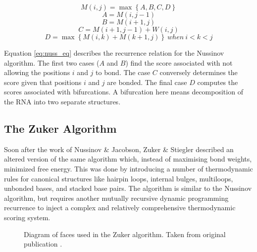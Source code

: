 \documentclass[12pt, a4paper]{article}
\begin{document}

\begin{equation} \label{eq:nuss_eq}
	M(i, j) = \max \left\lbrace A, B, C, D \right\rbrace
\end{equation}
\[
A = M(i, j-1)
\]
\[
B = M(i+1, j)
\]
\[
C = M(i+1, j-1) + W(i, j)
\]
\[
D = \max \left\lbrace M(i, k) + M(k+1, j) \right\rbrace \: when \: i < k < j
\]


Equation \ref{eq:nuss_eq} describes the recurrence relation for the Nussinov algorithm. The first two cases ($A$ and $B$) find the score associated with not allowing the positions $i$ and $j$ to bond. The case $C$ conversely determines the score given that positions $i$ and $j$ are bonded. The final case $D$ computes the scores associated with bifurcations. A bifurcation here means decomposition of the RNA into two separate structures.


\subsection{The Zuker Algorithm}
Soon after the work of Nussinov \& Jacobson, Zuker \& Stiegler \cite{zuker1981optimal}
described an altered version of the same algorithm which, instead of maximising
bond weights, minimized free energy. This was done
by introducing a number of thermodynamic rules for canonical structures like hairpin loops, internal bulges, multiloops, unbonded bases, and stacked base pairs. The algorithm is similar to the Nussinov algorithm,
but requires another mutually recursive dynamic programming recurrence to inject a complex and relatively comprehensive thermodynamic scoring system.


\begin{figure}
\begin{center}
\end{center}
\caption{Diagram of faces used in the Zuker algorithm. Taken from original
publication \cite{zuker1981optimal}.}
\label{zuk_struct}
\end{figure}
\end{document}
